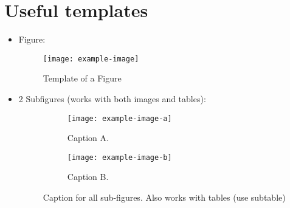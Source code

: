 \section*{Useful templates}
\begin{itemize}
    \item Figure: 
    \begin{figure}[tph]
        \centering
        \texttt{[image: example-image]}
        \caption{Template of a Figure}
        \label{fig:descriptive-label}
    \end{figure}
    
    \item 2 Subfigures (works with both images and tables):
    \begin{figure}[tph]
        \centering
        \begin{subfigure}{0.3\textwidth}
        \centering
        \texttt{[image: example-image-a]} %
        \caption{Caption A.}            %
        \label{subfig:subfig-example-a} %
        \end{subfigure}
        \hfill
        \begin{subfigure}{0.3\textwidth}
        \centering
        \texttt{[image: example-image-b]}
        \caption{Caption B.}
        \label{subfig:subfig-example-b}
        \end{subfigure}
        \hfill 
    \caption{Caption for all sub-figures. Also works with tables (use subtable)}  %
    \label{fig:subfig-example}              %
    \end{figure}
    

\end{itemize}
